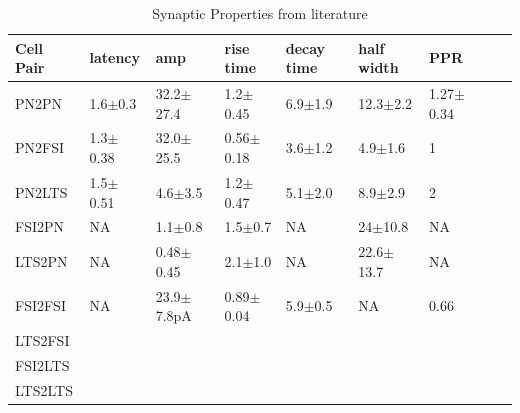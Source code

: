 \documentclass[12pt, letterpaper]{article}
\begin{document}
\begin{table}[H]
  \centering
  \caption{Synaptic Properties from literature}
  \begin{tabularx}{\textwidth}{|X|X|X|X|X|X|X|X|X|}
    \hline
    Cell Pair & latency                        & amp                             & rise time                       & decay time                     & half width                     & PPR \\ \hline
    PN2PN     & 1.6$\pm$0.3\cite{Morishima2011}  & 32.2$\pm$27.4\cite{Morishima2011} & 1.2$\pm$0.45\cite{Morishima2011}  &  6.9$\pm$1.9\cite{Morishima2011} & 12.3$\pm$2.2\cite{Beierlein2003} & 1.27$\pm$0.34\cite{Morishima2011} \\ \hline
    PN2FSI    & 1.3$\pm$0.38\cite{Morishima2017} & 32.0$\pm$25.5\cite{Morishima2017} & 0.56$\pm$0.18\cite{Morishima2017} & 3.6$\pm$1.2\cite{Morishima2017}  & 4.9$\pm$1.6\cite{Beierlein2003}  & 1\cite{Morishima2017} \\ \hline
    PN2LTS    & 1.5$\pm$0.51\cite{Morishima2017} & 4.6$\pm$3.5\cite{Morishima2017}   & 1.2$\pm$0.47\cite{Morishima2017}  & 5.1$\pm$2.0\cite{Morishima2017}  & 8.9$\pm$2.9\cite{Beierlein2003}  & 2\cite{Morishima2017} \\ \hline
    FSI2PN    & NA                               & 1.1$\pm$0.8\cite{Beierlein2003}   & 1.5$\pm$0.7\cite{Beierlein2003}   & NA                               & 24$\pm$10.8\cite{Beierlein2003}  & NA \\ \hline
    LTS2PN    & NA                               & 0.48$\pm$0.45\cite{Beierlein2003} & 2.1$\pm$1.0\cite{Beierlein2003}   & NA                               & 22.6$\pm$13.7\cite{Beierlein2003}& NA \\ \hline
    FSI2FSI   & NA                               & 23.9$\pm$7.8pA\cite{Galarreta2002}& 0.89$\pm$0.04\cite{Galarreta2002} & 5.9$\pm$0.5\cite{Galarreta2002}  & NA                               & 0.66\cite{Galarreta2002}\\ \hline
    LTS2FSI   &                                  &                                   &                                   &                                  &                                  &                          \\ \hline
    FSI2LTS   &                                  &                                   &                                   &                                  &                                  &                          \\ \hline
    LTS2LTS   &                                  &                                   &                                   &                                  &                                  &                          \\ \hline     
  
  \end{tabularx}
  \label{tab:syn_prop}
\end{table}
\end{document}
